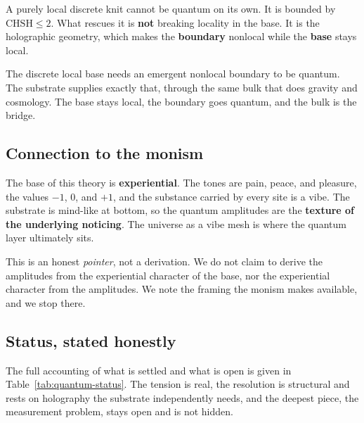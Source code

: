 A purely local discrete knit cannot be quantum on its own. It is bounded by $\mathrm{CHSH} \le 2$. What rescues it is \textbf{not} breaking locality in the base. It is the holographic geometry, which makes the \textbf{boundary} nonlocal while the \textbf{base} stays local.

\begin{principle}
The discrete local base needs an emergent nonlocal boundary to be quantum. The substrate supplies exactly that, through the same bulk that does gravity and cosmology. The base stays local, the boundary goes quantum, and the bulk is the bridge.
\end{principle}

\subsection{Connection to the monism}

The base of this theory is \textbf{experiential}. The tones are pain, peace, and pleasure, the values $-1$, $0$, and $+1$, and the substance carried by every site is a vibe. The substrate is mind-like at bottom, so the quantum amplitudes are the \textbf{texture of the underlying noticing}. The universe as a vibe mesh is where the quantum layer ultimately sits.

This is an honest \emph{pointer}, not a derivation. We do not claim to derive the amplitudes from the experiential character of the base, nor the experiential character from the amplitudes. We note the framing the monism makes available, and we stop there.

\subsection{Status, stated honestly}

The full accounting of what is settled and what is open is given in Table~\ref{tab:quantum-status}. The tension is real, the resolution is structural and rests on holography the substrate independently needs, and the deepest piece, the measurement problem, stays open and is not hidden.

